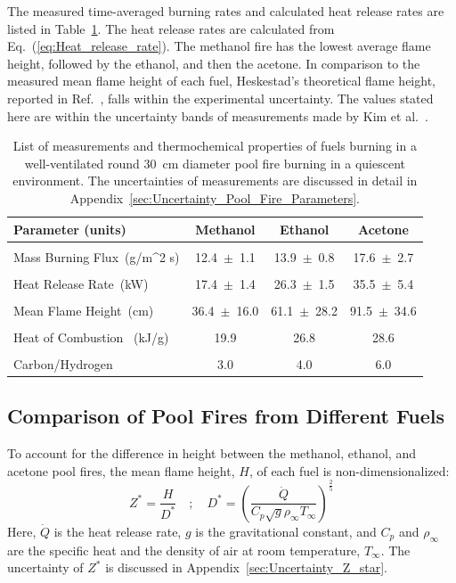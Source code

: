 \documentclass[12pt]{article}
\begin{document}
The measured time-averaged burning rates and calculated heat release rates are listed in Table~\ref{tab:Pool_Fire_Parameters_Table}. The heat release rates are calculated from Eq.~(\ref{eq:Heat_release_rate}). The methanol fire has the lowest average flame height, followed by the ethanol, and then the acetone. In comparison to the measured mean flame height of each fuel, Heskestad’s theoretical flame height, reported in Ref.~\cite{Heskestad1983}, falls within the experimental uncertainty. The values stated here are within the uncertainty bands of measurements made by Kim et al.~\cite{Kim2019}.

\begin{table}[!ht]
\caption{List of measurements and thermochemical properties of fuels burning in a well-ventilated round 30~cm diameter pool fire burning in a quiescent environment. The uncertainties of measurements are discussed in detail in Appendix~\ref{sec:Uncertainty_Pool_Fire_Parameters}.}
\label{tab:Pool_Fire_Parameters_Table}
\centering
	\footnotesize
	\begin{tabular}{lccc}
\hline
\textbf{Parameter (units)} &\textbf{Methanol}& \textbf{Ethanol}& \textbf{Acetone}\\
\hline
\\[0.01cm]
Mass Burning Flux~(\si{g/{m^2 s}})		&	12.4~$\pm$~1.1		&	13.9~$\pm$~0.8	&	17.6~$\pm$~2.7\\
\\[0.01cm]
Heat Release Rate~(\si{kW})			&	17.4~$\pm$~1.4		&	26.3~$\pm$~1.5	&	35.5~$\pm$~5.4\\
\\[0.01cm]
Mean Flame Height~(\si{cm})			&	36.4~$\pm$~16.0		&	61.1~$\pm$~28.2	&	91.5~$\pm$~34.6\\
\\[0.01cm]
Heat of Combustion~ (\si{kJ/g})			&	19.9				&	26.8			&	28.6			\\	
\\[0.01cm]
Carbon/Hydrogen 					&	3.0				&	4.0			&	6.0			\\
\hline
\end{tabular}
\end{table}

\subsection{Comparison of Pool Fires from Different Fuels}
\label{ssec:Fuel_comp}

To account for the difference in height between the methanol, ethanol, and acetone pool fires, the mean flame height, $H$, of each fuel is non-dimensionalized:
\begin{equation}\label{eq:Z_Star}
Z^*=\frac{H}{D^*}  \quad ; \quad  D^* = \left(\frac{\dot{Q}}{C_{p}\sqrt{g}\rho_\infty T_\infty}\right)^{\frac{2}{5}}
\end{equation}
Here, $\dot{Q}$ is the heat release rate, $g$ is the gravitational constant, and $C_p$ and $\rho_\infty$ are the specific heat and the density of air at room temperature, $T_\infty$. The uncertainty of $Z^*$ is discussed in Appendix~\ref{sec:Uncertainty_Z_star}.
\end{document}
